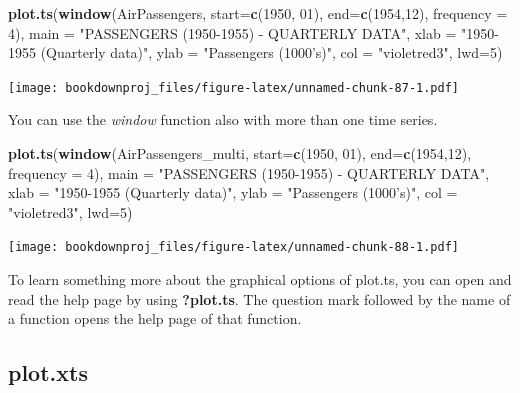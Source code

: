 \documentclass[
]{article}
\newenvironment{Shaded}{\begin{snugshade}}{\end{snugshade}}
\newcommand{\DataTypeTok}[1]{\textcolor[rgb]{0.13,0.29,0.53}{#1}}
\newcommand{\DecValTok}[1]{\textcolor[rgb]{0.00,0.00,0.81}{#1}}
\newcommand{\KeywordTok}[1]{\textcolor[rgb]{0.13,0.29,0.53}{\textbf{#1}}}
\newcommand{\NormalTok}[1]{#1}
\newcommand{\StringTok}[1]{\textcolor[rgb]{0.31,0.60,0.02}{#1}}
\begin{document}
\begin{Shaded}
\begin{Highlighting}[]
\KeywordTok{plot.ts}\NormalTok{(}\KeywordTok{window}\NormalTok{(AirPassengers, }\DataTypeTok{start=}\KeywordTok{c}\NormalTok{(}\DecValTok{1950}\NormalTok{, }\DecValTok{01}\NormalTok{), }\DataTypeTok{end=}\KeywordTok{c}\NormalTok{(}\DecValTok{1954}\NormalTok{,}\DecValTok{12}\NormalTok{), }\DataTypeTok{frequency =} \DecValTok{4}\NormalTok{), }
        \DataTypeTok{main =} \StringTok{"PASSENGERS (1950-1955) - QUARTERLY DATA"}\NormalTok{,}
        \DataTypeTok{xlab =} \StringTok{"1950-1955 (Quarterly data)"}\NormalTok{,}
        \DataTypeTok{ylab =} \StringTok{"Passengers (1000's)"}\NormalTok{,}
        \DataTypeTok{col =} \StringTok{"violetred3"}\NormalTok{, }
        \DataTypeTok{lwd=}\DecValTok{5}\NormalTok{)}
\end{Highlighting}
\end{Shaded}

\texttt{[image: bookdownproj\_files/figure-latex/unnamed-chunk-87-1.pdf]}

You can use the \emph{window} function also with more than one time series.

\begin{Shaded}
\begin{Highlighting}[]
\KeywordTok{plot.ts}\NormalTok{(}\KeywordTok{window}\NormalTok{(AirPassengers_multi, }\DataTypeTok{start=}\KeywordTok{c}\NormalTok{(}\DecValTok{1950}\NormalTok{, }\DecValTok{01}\NormalTok{), }\DataTypeTok{end=}\KeywordTok{c}\NormalTok{(}\DecValTok{1954}\NormalTok{,}\DecValTok{12}\NormalTok{), }\DataTypeTok{frequency =} \DecValTok{4}\NormalTok{), }
        \DataTypeTok{main =} \StringTok{"PASSENGERS (1950-1955) - QUARTERLY DATA"}\NormalTok{,}
        \DataTypeTok{xlab =} \StringTok{"1950-1955 (Quarterly data)"}\NormalTok{,}
        \DataTypeTok{ylab =} \StringTok{"Passengers (1000's)"}\NormalTok{,}
        \DataTypeTok{col =} \StringTok{"violetred3"}\NormalTok{, }
        \DataTypeTok{lwd=}\DecValTok{5}\NormalTok{)}
\end{Highlighting}
\end{Shaded}

\texttt{[image: bookdownproj\_files/figure-latex/unnamed-chunk-88-1.pdf]}

To learn something more about the graphical options of plot.ts, you can open and read the help page by using \textbf{?plot.ts}. The question mark followed by the name of a function opens the help page of that function.

\hypertarget{plot.xts}{%
\subsection{plot.xts}\label{plot.xts}}
\end{document}
